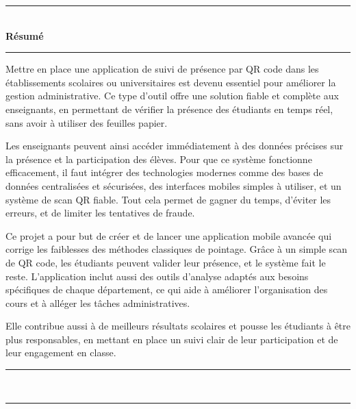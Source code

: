 \documentclass[12pt,a4paper]{report}
\begin{document}
\newpage
\newenvironment{Résumé}{
    \newpage
    \phantomsection
    \addcontentsline{toc}{chapter}{Résumé}
    \begin{center}
        {\color{mintgreen} \rule{\textwidth}{2pt} }\\[0.3cm]
        {\Large \textbf{Résumé}}\\[0.3cm]
        {\color{mintgreen} \rule{0.8\textwidth}{1.5pt} }
    \end{center}
    \vspace{0.5cm}
    \noindent
}{
    \vspace{0.5cm}
    \begin{center}
        {\color{mintgreen} \rule{0.8\textwidth}{1.5pt} }\\[0.3cm]
        {\color{mintgreen} \rule{\textwidth}{2pt} }
    \end{center}
}
\begin{Résumé}
Mettre en place une application de suivi de présence par QR code dans les établissements scolaires ou universitaires est devenu essentiel pour améliorer la gestion administrative. Ce type d’outil offre une solution fiable et complète aux enseignants, en permettant de vérifier la présence des étudiants en temps réel, sans avoir à utiliser des feuilles papier.

Les enseignants peuvent ainsi accéder immédiatement à des données précises sur la présence et la participation des élèves. Pour que ce système fonctionne efficacement, il faut intégrer des technologies modernes comme des bases de données centralisées et sécurisées, des interfaces mobiles simples à utiliser, et un système de scan QR fiable. Tout cela permet de gagner du temps, d’éviter les erreurs, et de limiter les tentatives de fraude.

Ce projet a pour but de créer et de lancer une application mobile avancée qui corrige les faiblesses des méthodes classiques de pointage. Grâce à un simple scan de QR code, les étudiants peuvent valider leur présence, et le système fait le reste. L’application inclut aussi des outils d’analyse adaptés aux besoins spécifiques de chaque département, ce qui aide à améliorer l’organisation des cours et à alléger les tâches administratives.

Elle contribue aussi à de meilleurs résultats scolaires et pousse les étudiants à être plus responsables, en mettant en place un suivi clair de leur participation et de leur engagement en classe.
\end{Résumé}
\end{document}
